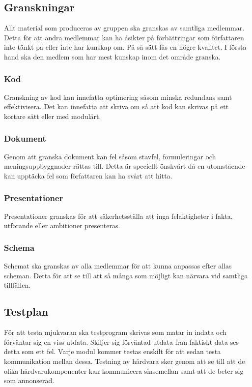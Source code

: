 \documentclass[projektplan/plan.tex]{subfiles}
\begin{document}
\subsection{Granskningar}
Allt material som produceras av gruppen ska granskas av samtliga medlemmar. Detta för att andra medlemmar kan ha åsikter på förbättringar som författaren inte tänkt på eller inte har kunskap om. På så sätt fås en högre kvalitet. I första hand ska den medlem som har mest kunskap inom det område granska.

\subsubsection{Kod}	
Granskning av kod kan innefatta optimering såsom minska redundans samt effektivisera. Det kan innefatta att skriva om så att kod kan skrivas på ett kortare sätt eller med modulärt.

\subsubsection{Dokument}	
Genom att granska dokument kan fel såsom stavfel, formuleringar och meningsuppbyggnader rättas till. Detta är speciellt önskvärt då en utomstående kan upptäcka fel som författaren kan ha svårt att hitta.

\subsubsection{Presentationer}	
Presentationer granskas för att säkerhetsställa att inga felaktigheter i fakta, utförande eller ambitioner presenteras.

\subsubsection{Schema}	
Schemat ska granskas av alla medlemmar för att kunna anpassas efter allas scheman. Detta för att se till att så många som möjligt kan närvara vid samtliga tillfällen. 

\subsection{Testplan}
För att testa mjukvaran ska testprogram skrivas som matar in indata och förväntar sig en viss utdata. Skiljer sig förväntad utdata från faktiskt data ses detta som ett fel. Varje modul kommer testas enskilt för att sedan testa kommunikation mellan dessa. Testning av hårdvara sker genom att se till att de olika hårdvarukomponenter kan kommunicera sinsemellan samt att de beter sig som annonserad.
\end{document}
